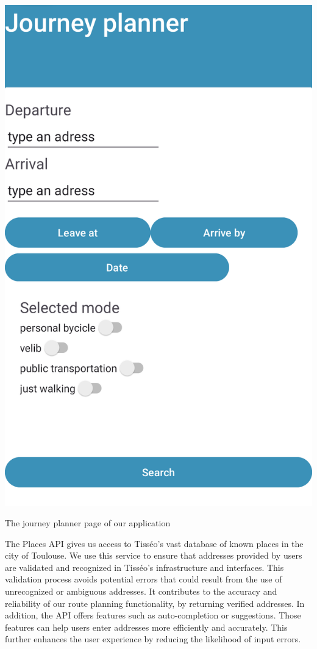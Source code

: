 \begin{center}

\includegraphics[scale=0.15]{content/journey-settings-cut.png}



The journey planner page of our application
\end{center}




The Places API gives us access to Tisséo's vast database of known places in the city of Toulouse. We use this service to ensure that addresses provided by users are validated and recognized in Tisséo's infrastructure and interfaces. This validation process avoids potential errors that could result from the use of unrecognized or ambiguous addresses. It contributes to the accuracy and reliability of our route planning functionality, by returning verified addresses.
In addition, the API offers features such as auto-completion or suggestions. Those features can help users enter addresses more efficiently and accurately. This further enhances the user experience by reducing the likelihood of input errors.



